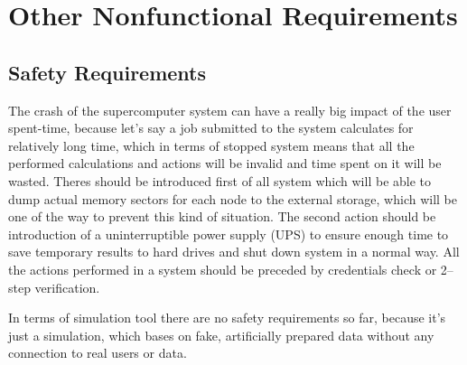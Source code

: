 \documentclass{report}
\begin{document}
\chapter{Other Nonfunctional Requirements}


\section{Safety Requirements}

The crash of the supercomputer system can have a really big impact of the user spent-time, because let's say a job submitted to the system calculates for relatively long time, which in terms of stopped system means that all the performed calculations and actions will be invalid and time spent on it will be wasted. Theres should be introduced first of all system which will be able to dump actual memory sectors for each node to the external storage, which will be one of the way to prevent this kind of situation. The second action should be introduction of a uninterruptible power supply (UPS) to ensure enough time to save temporary results to hard drives and shut down system in a normal way. All the actions performed in a system should be preceded by credentials check or 2--step verification.
	
In terms of simulation tool there are no safety requirements so far, because it's just a simulation, which bases on fake, artificially prepared data without any connection to real users or data.
\end{document}
